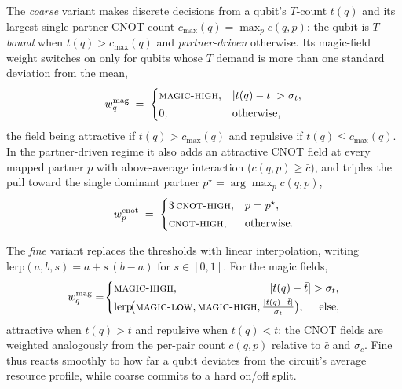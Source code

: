 
The \emph{coarse} variant makes discrete decisions from a qubit's $T$-count $t(q)$
and its largest single-partner CNOT count $c_{\max}(q)=\max_{p}c(q,p)$: the qubit
is \emph{$T$-bound} when $t(q)>c_{\max}(q)$ and \emph{partner-driven} otherwise.
Its magic-field weight switches on only for qubits whose $T$ demand is more than
one standard deviation from the mean,
\begin{equation*}
w^{\mathrm{mag}}_q \;=\;
\begin{cases}
\textsc{magic-high}, & |t(q)-\bar t|>\sigma_t,\\[2pt]
0, & \text{otherwise,}
\end{cases}
\end{equation*}
the field being attractive if $t(q)>c_{\max}(q)$ and repulsive if
$t(q)\le c_{\max}(q)$. In the partner-driven regime it also adds an attractive
CNOT field at every mapped partner $p$ with above-average interaction
($c(q,p)\ge\bar c$), and triples the pull toward the single dominant partner
$p^{\star}=\arg\max_p c(q,p)$,
\begin{equation*}
w^{\mathrm{cnot}}_{p} \;=\;
\begin{cases}
3\,\textsc{cnot-high}, & p=p^{\star},\\[2pt]
\textsc{cnot-high}, & \text{otherwise.}
\end{cases}
\end{equation*}

The \emph{fine} variant replaces the thresholds with linear interpolation, writing
$\mathrm{lerp}(a,b,s)=a+s\,(b-a)$ for $s\in[0,1]$. For the magic fields,
\begin{equation*}
w^{\mathrm{mag}}_q =\!
\begin{cases}
\textsc{magic-high}, & \hspace{-40pt} |t(q)-\bar t|>\sigma_t,\\[2pt]
\mathrm{lerp}\!\big(\textsc{magic-low},\textsc{magic-high},\tfrac{|t(q)-\bar t|}{\sigma_t}\big), & \hspace{5pt} \text{else},
\end{cases}
\end{equation*}
attractive when $t(q)>\bar t$ and repulsive when $t(q)<\bar t$; the CNOT fields are
weighted analogously from the per-pair count $c(q,p)$ relative to $\bar c$ and
$\sigma_c$. Fine thus reacts smoothly to how far a qubit deviates from the
circuit's average resource profile, while coarse commits to a hard on/off split.

